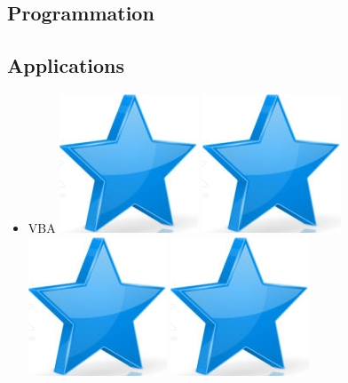 \documentclass[10pt,a4paper,sans]{article}
\begin{document}
\begin{minipage}[t]{0.28\textwidth}
\begin{mdframed}[style=cadreCompetences]
        \section{Programmation}
        \subsection{Applications}
            \begin{itemize}
                \item{VBA
                    \hfill
                    \includegraphics[scale=0.25]{img/star.png} \hspace{-0.22cm}
                    \includegraphics[scale=0.25]{img/star.png} \hspace{-0.22cm}
                    \includegraphics[scale=0.25]{img/star.png} \hspace{-0.22cm}
                    \includegraphics[scale=0.25]{img/star.png} \hspace{-0.22cm}
}
\end{itemize}
\end{mdframed}
\end{minipage}
\end{document}
